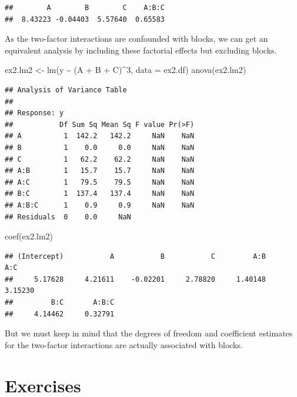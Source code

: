 \documentclass[
]{book}
\newenvironment{Shaded}{\begin{snugshade}}{\end{snugshade}}
\newcommand{\AttributeTok}[1]{\textcolor[rgb]{0.77,0.63,0.00}{#1}}
\newcommand{\DecValTok}[1]{\textcolor[rgb]{0.00,0.00,0.81}{#1}}
\newcommand{\FunctionTok}[1]{\textcolor[rgb]{0.00,0.00,0.00}{#1}}
\newcommand{\NormalTok}[1]{#1}
\newcommand{\OtherTok}[1]{\textcolor[rgb]{0.56,0.35,0.01}{#1}}
\newcommand{\SpecialCharTok}[1]{\textcolor[rgb]{0.00,0.00,0.00}{#1}}
\theoremstyle{definition}
\theoremstyle{definition}
\theoremstyle{definition}
\theoremstyle{definition}
\theoremstyle{remark}
\begin{document}
\begin{verbatim}
##        A        B        C    A:B:C 
##  8.43223 -0.04403  5.57640  0.65583
\end{verbatim}

As the two-factor interactions are confounded with blocks, we can get an equivalent analysis by including these factorial effects but excluding blocks.

\begin{Shaded}
\begin{Highlighting}[]
\NormalTok{ex2.lm2 }\OtherTok{\textless{}{-}} \FunctionTok{lm}\NormalTok{(y }\SpecialCharTok{\textasciitilde{}}\NormalTok{  (A }\SpecialCharTok{+}\NormalTok{ B }\SpecialCharTok{+}\NormalTok{ C)}\SpecialCharTok{\^{}}\DecValTok{3}\NormalTok{, }\AttributeTok{data =}\NormalTok{ ex2.df)}
\FunctionTok{anova}\NormalTok{(ex2.lm2)}
\end{Highlighting}
\end{Shaded}

\begin{verbatim}
## Analysis of Variance Table
## 
## Response: y
##           Df Sum Sq Mean Sq F value Pr(>F)
## A          1  142.2   142.2     NaN    NaN
## B          1    0.0     0.0     NaN    NaN
## C          1   62.2    62.2     NaN    NaN
## A:B        1   15.7    15.7     NaN    NaN
## A:C        1   79.5    79.5     NaN    NaN
## B:C        1  137.4   137.4     NaN    NaN
## A:B:C      1    0.9     0.9     NaN    NaN
## Residuals  0    0.0     NaN
\end{verbatim}

\begin{Shaded}
\begin{Highlighting}[]
\FunctionTok{coef}\NormalTok{(ex2.lm2)}
\end{Highlighting}
\end{Shaded}

\begin{verbatim}
## (Intercept)           A           B           C         A:B         A:C 
##     5.17628     4.21611    -0.02201     2.78820     1.40148     3.15230 
##         B:C       A:B:C 
##     4.14462     0.32791
\end{verbatim}

But we must keep in mind that the degrees of freedom and coefficient estimates for the two-factor interactions are actually associated with blocks.

\hypertarget{exercises-4}{%
\section{Exercises}\label{exercises-4}}
\end{document}
